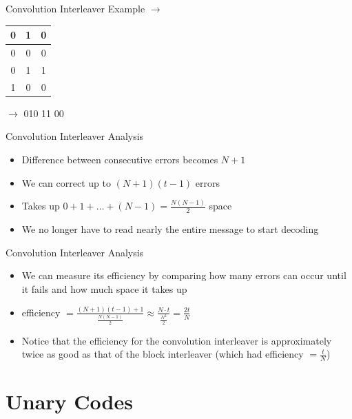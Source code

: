 \documentclass[aspectratio=169]{beamer}
\makeatletter
\newcommand{\err}[1]{{\color{sigma@alertred}#1}}
\makeatother
\begin{document}
\begin{frame}{Convolution Interleaver Example}
    $\to$
    
    \begin{table}
        \centering
        \begin{tabular}{|c|c|c|}
            \hline 
            0 & \err{1} & 0 \\ \hline
            0 & 0 & 0 \\ \hline
            \err{0} & 1 & 1 \\ \hline
            \err{1} & 0 & 0 \\ \hline
        \end{tabular}
    \end{table} \pause

    $\to$ 0\err{1}0  \quad \err{0}11 \quad \err{1}00
\end{frame}


\begin{frame}{Convolution Interleaver Analysis}
    \begin{itemize}
        \item Difference between consecutive errors becomes $N + 1$
        \item We can correct up to $(N + 1)(t - 1)$ errors
        \item Takes up $0 + 1 + \ldots + (N - 1) = \frac {N (N - 1)} 2$ space \pause
        \item We no longer have to read nearly the entire message to start decoding
    \end{itemize}
\end{frame}


\begin{frame}{Convolution Interleaver Analysis}
    \begin{itemize}
        \item We can measure its efficiency by comparing how many errors can occur until it fails and how much space it takes up
        \item efficiency $= \frac {(N + 1)(t - 1) + 1}{\frac {N (N - 1)} 2} \approx \frac {N \cdot t}{\frac {N^2} 2} = \frac {2t} N$ \pause
        \item Notice that the efficiency for the convolution interleaver is approximately twice as good as that of the block interleaver (which had efficiency $= \frac t N$)
    \end{itemize}
\end{frame}


\section{Unary Codes}
\frame{\sectionpage}
\end{document}
